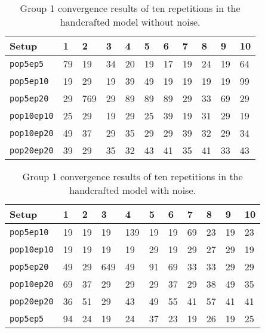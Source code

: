 \begin{table}
	\centering
	\begin{tabular}{lllllllllll}
		\hline
		\textbf{Setup} & \textbf{1} & \textbf{2} & \textbf{3} & \textbf{4} & \textbf{5} & \textbf{6} & \textbf{7} & \textbf{8} & \textbf{9} & \textbf{10} \\\hline
		\texttt{pop5ep5} & 79 & 19 & 34 & 20 & 19 & 17 & 19 & 24 & 19 & 64 \\
		\texttt{pop5ep10} & 19 & 29 & 19 & 39 & 49 & 19 & 19 & 19 & 19 & 99 \\
		\texttt{pop5ep20} & 29 & 769 & 29 & 89 & 89 & 89 & 29 & 33 & 69 & 29 \\
		\texttt{pop10ep10} & 25 & 29 & 19 & 29 & 25 & 39 & 19 & 31 & 29 & 19 \\
		\texttt{pop10ep20} & 49 & 37 & 29 & 35 & 29 & 29 & 39 & 32 & 29 & 34 \\
		\texttt{pop20ep20} & 39 & 29 & 35 & 32 & 43 & 41 & 35 & 41 & 33 & 43 \\
	\end{tabular}
	\caption{Group 1 convergence results of ten repetitions in the handcrafted
	model without noise.}
	\label{tab:apx_conv_group1}
\end{table}
\begin{table}
	\centering
	\begin{tabular}{lllllllllll}
		\hline
		\textbf{Setup} & \textbf{1} & \textbf{2} & \textbf{3} & \textbf{4} & \textbf{5} & \textbf{6} & \textbf{7} & \textbf{8} & \textbf{9} & \textbf{10} \\\hline
		\texttt{pop5ep10} & 19 & 19 & 19 & 139 & 19 & 19 & 69 & 23 & 19 & 23 \\
		\texttt{pop10ep10} & 19 & 19 & 19 & 19 & 29 & 19 & 29 & 27 & 29 & 19 \\
		\texttt{pop5ep20} & 49 & 29 & 649 & 49 & 91 & 69 & 33 & 33 & 29 & 29 \\
		\texttt{pop10ep20} & 69 & 37 & 29 & 29 & 29 & 37 & 29 & 38 & 49 & 35 \\
		\texttt{pop20ep20} & 36 & 51 & 29 & 43 & 49 & 55 & 41 & 57 & 41 & 41 \\
		\texttt{pop5ep5} & 94 & 24 & 19 & 24 & 37 & 23 & 19 & 26 & 19 & 25 \\
	\end{tabular}
	\caption{Group 1 convergence results of ten repetitions in the handcrafted
	model with noise.}
	\label{tab:apx_conv_group1_noise}
\end{table}
